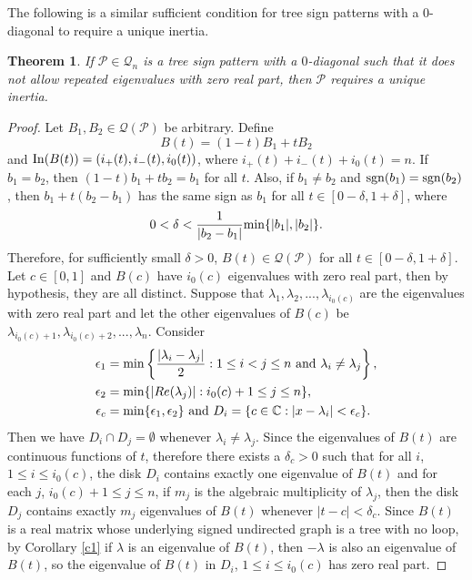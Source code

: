 \documentclass[a4paper, 10pt]{article}
\newtheorem{theorem}{Theorem}[section]
\numberwithin{equation}{section}
\def\sgn{{\rm sgn}}
\def\In{{\rm In}}
\def\min{{\rm min}}
\begin{document}
	
	The following is a similar sufficient condition for tree sign patterns with a $0$-diagonal to require a unique inertia.
	
	\begin{theorem} \label{l3.3ne}
		If $\mathcal{P}\in \mathcal{Q}_n$ is a tree sign pattern with a $0$-diagonal such that it does not allow repeated eigenvalues with zero real part, then $\mathcal{P}$ requires a unique inertia.
	\end{theorem}
	\begin{proof}
		Let $B_1,B_2\in \mathcal{Q}(\mathcal{P})$ be arbitrary. Define $$B(t)=(1-t)B_1+tB_2$$ and $\In(B(t))=(i_+(t),i_-(t),i_0(t))$, where $i_+(t)+i_-(t)+i_0(t)=n$. If $b_1=b_2$, then $(1-t)b_1+tb_2=b_1$ for all $t$. Also, if $b_1 \neq b_2$ and $\sgn(b_1)=\sgn(b_2)$, then $b_1+t(b_2-b_1)$ has the same sign as $b_1$ for all $t\in [0-\delta, 1+\delta]$, where $$0<\delta<\frac{1}{|b_2-b_1|}\min\{|b_1|,|b_2|\}.$$ Therefore, for sufficiently small $\delta>0$, $B(t)\in \mathcal{Q}(\mathcal{P})$ for all $t\in [0-\delta,1+\delta]$. Let $c\in [0,1]$ and $B(c)$ have $i_0(c)$ eigenvalues with zero real part, then by hypothesis, they are all distinct. Suppose that $\lambda_1, \lambda_2,...,\lambda_{i_0(c)}$ are the eigenvalues with zero real part and let the other eigenvalues of $B(c)$ be $\lambda_{i_0(c)+1}, \lambda_{i_0(c)+2},...,\lambda_n$. Consider 
		\begin{align*}
			\epsilon_1&=\min\left\{ \frac{|\lambda_i-\lambda_j|}{2}: 1\leq i<j\leq n~ \text{and} ~ \lambda_i\neq \lambda_j\right\},\\ \epsilon_2&=\min\{|Re(\lambda_j)|: i_0(c)+1\leq j\leq n\},\\ \epsilon_c&=\min\{\epsilon_1,\epsilon_2\}~ \text{and} ~ D_i=\{c\in \mathbb{C}: |x-\lambda_i|<\epsilon_c\}.
		\end{align*}
		Then we have $D_i\cap D_j=\emptyset$ whenever $\lambda_i\neq \lambda_j$. Since the eigenvalues of $B(t)$ are continuous functions of $t$, therefore there exists a $\delta_c>0$ such that for all $i$, $1\leq i\leq i_0(c)$, the disk $D_i$ contains exactly one eigenvalue of $B(t)$ and for each $j$, $i_0(c)+1\leq j\leq n$, if $m_j$ is the algebraic multiplicity of $\lambda_j$, then the disk $D_j$ contains exactly $m_j$ eigenvalues of $B(t)$ whenever $|t-c|<\delta_c$. Since $B(t)$ is a real matrix whose underlying signed undirected graph is a tree with no loop, by Corollary \ref{c1} if $\lambda$ is an eigenvalue of $B(t)$, then $-\lambda$ is also an eigenvalue of $B(t)$, so the eigenvalue of $B(t)$ in $D_i$, $1\leq i\leq i_0(c)$ has zero real part.

\end{proof}
\end{document}
